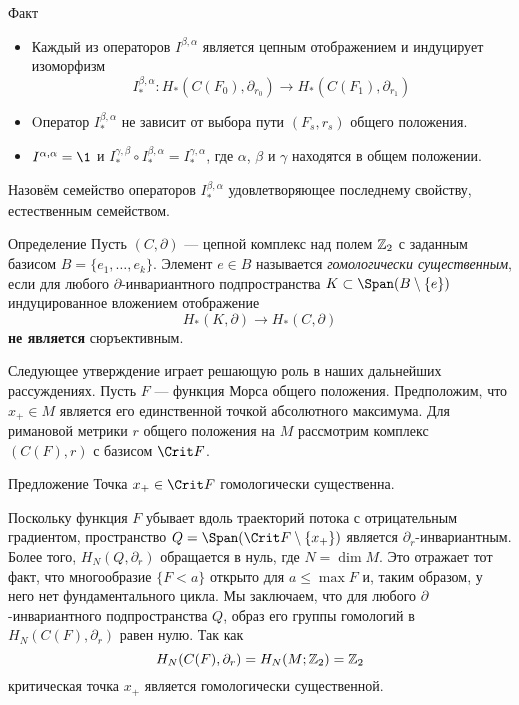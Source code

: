 \begin{thm}{Факт}\label{13.2.E}
  \begin{itemize}
  \item
    Каждый из операторов $I^{\beta,\alpha}$ является цепным
    отображением и индуцирует изоморфизм
    \[
    I^{\beta,\alpha}_{*} :
    H_{*}(C(F_{0}),\partial_{r_{0}}) \to
    H_{*}(C(F_{1}),\partial_{r_{1}})
    \]
  \item
    Oператор $I^{\beta,\alpha}_{*}$ не зависит от выбора пути
    $(F_{s},r_{s})$ общего положения.
  \item
    $I^{\alpha,\alpha}=\1$ и $I^{\gamma,\beta}_{*}\circ
    I^{\beta,\alpha}_{*}=I^{\gamma,\alpha}_{*}$, где $\alpha$, $\beta$ и
    $\gamma$ находятся в общем положении.
  \end{itemize}
\end{thm}

Назовём семейство операторов $I^{\beta,\alpha}_{*}$ удовлетворяющее
последнему свойству, естественным семейством. 

\begin{ex}{Определение}\label{13.2.F}
Пусть $(C, \partial)$ — цепной комплекс над полем $\mathbb{Z}_{2}$ с заданным
базисом $B = \{e_{1},\dots,e_{k}\}$. 
Элемент $e\in B$ называется \emph{гомологически существенным}, если для 
любого $\partial$-инвариантного подпространства $K\subset
\Span(B\setminus \{e\})$ индуцированное вложением отображение 
\[
H_{*}(K,\partial)\to H_{*}(C,\partial)
\]
\textbf{не является} сюръективным.
\end{ex}

Следующее утверждение играет решающую роль в наших дальнейших рассуждениях.
Пусть $F$ — функция Морса общего положения.
Предположим, что $x_{+}\in M$ является его единственной точкой
абсолютного максимума. 
Для римановой метрики $r$ общего положения на $M$ рассмотрим комплекс
$(C(F),r)$ с базисом $\Crit F$. 

\begin{thm}{Предложение}\label{13.2.G}
  Точка $x_{+}\in\Crit F$ гомологически существенна.  
\end{thm}
 Поскольку функция $F$
убывает вдоль траекторий потока с отрицательным градиентом,
пространство
$Q \z= \Span(\Crit F \setminus \{x_{+}\})$ является $\partial_{r}$-инвариантным.
Более того, $H_{N}(Q,\partial_{r})$ обращается в нуль, где $N = \dim M$.
Это отражает тот факт, что многообразие $\{F<a\}$ открыто для $a\le
\max F$ и, таким образом, у него нет фундаментального цикла. 
Мы заключаем, что для любого $\partial$-инвариантного подпространства
$Q$, образ его группы гомологий в $H_{N}(C(F),\partial_{r})$ равен
нулю. Так как
\[
H_{N}(C(F),\partial_{r})=H_{N}(M;\mathbb{Z}_{2})=\mathbb{Z}_{2}
\]
критическая точка $x_{+}$ является гомологически существенной.
\qeds


